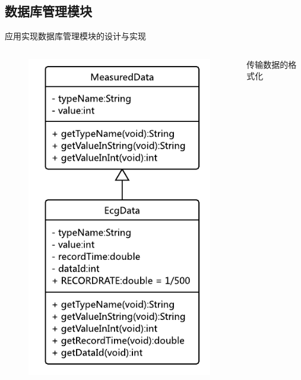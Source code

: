 \documentclass[aspectratio=43,fleqn]{beamer}
\begin{document}
\subsection{数据库管理模块}
\begin{frame}{应用实现}{数据库管理模块的设计与实现}
\begin{columns}
	\begin{figure}[ht]
		\includegraphics[width=\textwidth]{fig5.png}
	\end{figure}
	\begin{block}{传输数据的格式化}

\end{block}
\end{columns}
\end{frame}
\end{document}
